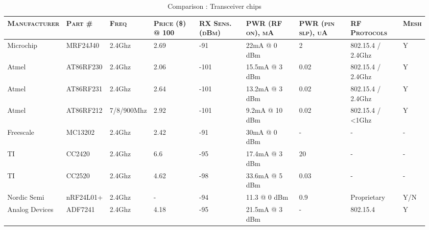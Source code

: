    \begin{sidewaystable}[h]
     \centering
     \begin{tabularx}{1\textwidth}{l l l p{1.5cm} p{1.5cm} l p{2.5cm} l l}
       \toprule
        \textsc{Manufacturer}
        & \textsc{Part \#}
        & \textsc{Freq}
        & \textsc{Price (\$) @ 100}
        & \textsc{RX Sens. (dBm)}
        & \textsc{PWR (RF on), mA}
        & \textsc{PWR (pin slp), uA}
        & \textsc{RF Protocols}
        & \textsc{Mesh }
        \\ \hline
        Microchip      & MRF24J40  & 2.4Ghz     & 2.69            & -91            & 22mA @ 0 dBm      & 2                 & 802.15.4 / 2.4Ghz & Y    \\ 
        Atmel          & AT86RF230 & 2.4Ghz     & 2.06            & -101           & 15.5mA @ 3 dBm    & 0.02              & 802.15.4 / 2.4Ghz & Y    \\ 
        Atmel          & AT86RF231 & 2.4Ghz     & 2.64            & -101           & 13.2mA @ 3 dBm    & 0.02              & 802.15.4 / 2.4Ghz & Y    \\ 
        Atmel          & AT86RF212 & 7/8/900Mhz & 2.92            & -101           & 9.2mA @ 10 dBm    & 0.02              & 802.15.4 / <1Ghz  & Y    \\ 
        Freescale      & MC13202   & 2.4Ghz     & 2.42            & -91            & 30mA @ 0 dBm      & -                 & -                 & -    \\ 
        TI             & CC2420    & 2.4Ghz     & 6.6             & -95            & 17.4mA @ 3 dBm    & 20                & -                 & -    \\ 
        TI             & CC2520    & 2.4Ghz     & 4.62            & -98            & 33.6mA @ 5 dBm    & 0.03              & -                 & -    \\ 
        Nordic Semi    & nRF24L01+ & 2.4Ghz     & -               & -94            & 11.3 @ 0 dBm      & 0.9               & Proprietary       & Y/N  \\ 
        Analog Devices & ADF7241   & 2.4Ghz     & 4.18            & -95            & 21.5mA @ 3 dBm    & -                 & 802.15.4          & Y    \\ 
        \bottomrule
     \end{tabularx}
     \caption{Comparison : Transceiver chips}
     \label{tab:transceiver-comparison}
   \end{sidewaystable}


